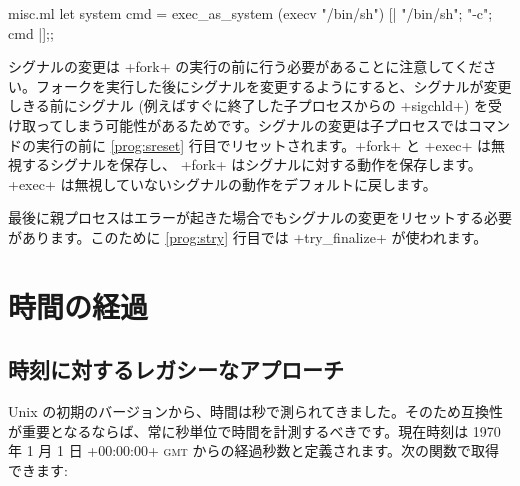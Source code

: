 \begin{example}
\begin{listingcodefile}[style=numbers]{misc.ml}
let system cmd =
  exec_as_system (execv "/bin/sh") [| "/bin/sh"; "-c"; cmd |];;
\end{listingcodefile}
%
シグナルの変更は \ml+fork+ の実行の前に行う必要があることに注意してください。フォークを実行した後にシグナルを変更するようにすると、シグナルが変更しきる前にシグナル (例えばすぐに終了した子プロセスからの \ml+sigchld+) を受け取ってしまう可能性があるためです。シグナルの変更は子プロセスではコマンドの実行の前に \ref{prog:sreset} 行目でリセットされます。\ml+fork+ と \ml+exec+ は無視するシグナルを保存し、 \ml+fork+ はシグナルに対する動作を保存します。\ml+exec+ は無視していないシグナルの動作をデフォルトに戻します。

最後に親プロセスはエラーが起きた場合でもシグナルの変更をリセットする必要があります。このために \ref{prog:stry} 行目では \ml+try_finalize+ が使われます。
\end{example}


\section{時間の経過}

\subsection*{時刻に対するレガシーなアプローチ}

Unix の初期のバージョンから、時間は秒で測られてきました。そのため互換性が重要となるならば、常に秒単位で時間を計測するべきです。現在時刻は 1970 年 1 月 1 日 \ml+00:00:00+ \textsc{gmt} からの経過秒数と定義されます。次の関数で取得できます:

